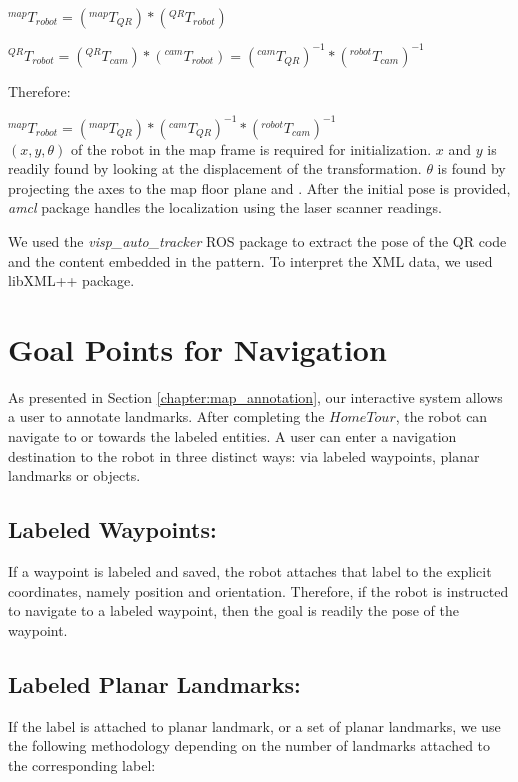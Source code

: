 $^{map}T_{robot}=(^{map}T_{QR})*(^{QR}T_{robot})$

$^{QR}T_{robot}=(^{QR}T_{cam})*(^{cam}T_{robot})=(^{cam}T_{QR})^{-1} * (^{robot}T_{cam})^{-1}$

Therefore:

$^{map}T_{robot}=(^{map}T_{QR})*(^{cam}T_{QR})^{-1} * (^{robot}T_{cam})^{-1}$\\



$(x,y,\theta)$ of the robot in the map frame is required for initialization. $x$ and $y$ is readily found by looking at the displacement of the transformation. $\theta$ is found by projecting the axes to the map floor plane and . After the initial pose is provided, \textit{amcl} package handles the localization using the laser scanner readings.

We used the \textit{visp\_auto\_tracker} ROS package to extract the pose of the QR code and the content embedded in the pattern. To interpret the XML data, we used libXML++ package.


\section{Goal Points for Navigation}
\label{sec:navigation_finding_goal_points_for_navigation}

As presented in Section \ref{chapter:map_annotation}, our interactive system allows a user to annotate landmarks. After completing the $Home Tour$, the robot can navigate to or towards the labeled entities.
A user can enter a navigation destination to the robot in three distinct ways: via labeled waypoints, planar landmarks or objects.

\subsection{Labeled Waypoints:} If a waypoint is labeled and saved, the robot attaches that label to the explicit coordinates, namely position and orientation. Therefore, if the robot is instructed to navigate to a labeled waypoint, then the goal is readily the pose of the waypoint.
\subsection{Labeled Planar Landmarks:} If the label is attached to planar landmark, or a set of planar landmarks, we use the following methodology depending on the number of landmarks attached to the corresponding label:

